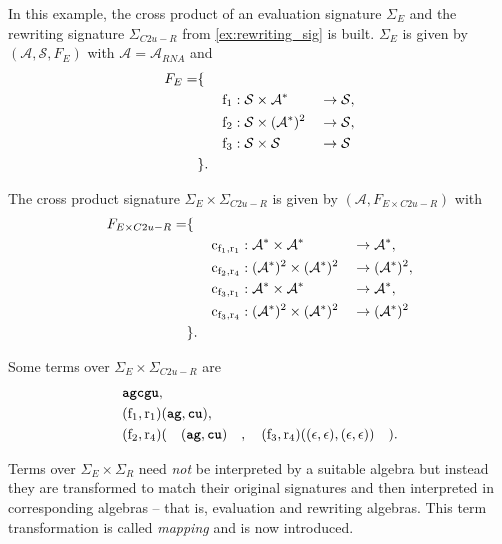 \documentclass[
    a4paper,
    12pt,
    twoside,
    BCOR=12mm,
    parskip=half,
    chapterprefix,
    numbers=noenddot,
    bibliography=totoc
]{scrbook}
\begin{document}
\begin{example}
	In this example, the cross product of an evaluation signature $\Sigma_{E}$ and the rewriting signature $\Sigma_{C2u-R}$ from \cref{ex:rewriting_sig} is built. $\Sigma_E$ is given by $(\mathcal{A},\mathcal{S},F_E)$ with $\mathcal{A} = \mathcal{A}_{RNA}$ and
	\begin{align*}
		F_E = &\{&&&&\\
		&&\mathrm{f}_1 &: \mathcal{S} \times \mathcal{A}^* &&\to \mathcal{S},\\
		&&\mathrm{f}_2 &: \mathcal{S} \times (\mathcal{A}^*)^2 &&\to \mathcal{S},\\
		&&\mathrm{f}_3 &: \mathcal{S} \times \mathcal{S} &&\to \mathcal{S}\\
		&\}.&&&&
	\end{align*}
	
	The cross product signature $\Sigma_E \times \Sigma_{C2u-R}$ is given by $(\mathcal{A},F_{E \times C2u-R})$ with
	\begin{align*}
		F_{E \times C2u-R} = &\{&&&&\\
		&&\mathrm{c}_{\mathrm{f}_1,\mathrm{r}_1} &: \mathcal{A}^* \times \mathcal{A}^* &&\to \mathcal{A}^*,\\
		&&\mathrm{c}_{\mathrm{f}_2,\mathrm{r}_4} &: (\mathcal{A}^*)^2 \times (\mathcal{A}^*)^2 &&\to (\mathcal{A}^*)^2,\\
		&&\mathrm{c}_{\mathrm{f}_3,\mathrm{r}_1} &: \mathcal{A}^* \times \mathcal{A}^* &&\to \mathcal{A}^*,\\
		&&\mathrm{c}_{\mathrm{f}_3,\mathrm{r}_4} &: (\mathcal{A}^*)^2 \times (\mathcal{A}^*)^2 &&\to (\mathcal{A}^*)^2\\
		&\}.&&&&
	\end{align*}
	
	Some terms over $\Sigma_E \times \Sigma_{C2u-R}$ are
	\begin{align*}
		&\ts{agcgu},\\
		&(\op{f}_1,\op{r}_1)(\ts{ag},\ts{cu}),\\
		&(\op{f}_2,\op{r}_4)(\quad (\ts{ag},\ts{cu})\quad,\quad (\op{f}_3,\op{r}_4)((\epsilon,\epsilon),(\epsilon,\epsilon)) \quad).\\
	\end{align*}
\end{example}

Terms over $\Sigma_E \times \Sigma_R$ need \emph{not} be interpreted by a suitable algebra but instead they are transformed to match their original signatures and then interpreted in corresponding algebras -- that is, evaluation and rewriting algebras. This term transformation is called \emph{mapping} and is now introduced.
\end{document}
